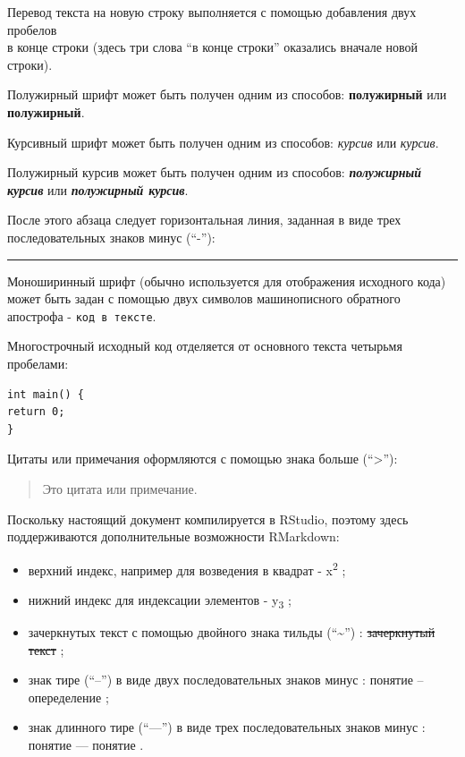 \documentclass[
  a4paper,
]{book}
\providecommand{\tightlist}{%
  \setlength{\itemsep}{0pt}\setlength{\parskip}{0pt}}
\theoremstyle{definition}
\theoremstyle{definition}
\theoremstyle{definition}
\theoremstyle{definition}
\theoremstyle{remark}
\begin{document}
Перевод текста на новую строку выполняется с помощью добавления двух пробелов\\
в конце строки (здесь три слова ``в конце строки'' оказались вначале новой строки).

Полужирный шрифт может быть получен одним из способов: \textbf{полужирный} или \textbf{полужирный}.

Курсивный шрифт может быть получен одним из способов: \emph{курсив} или \emph{курсив}.

Полужирный курсив может быть получен одним из способов: \textbf{\emph{полужирный курсив}} или \textbf{\emph{полужирный курсив}}.

После этого абзаца следует горизонтальная линия, заданная в виде трех последовательных знаков минус (``-''):

\begin{center}\rule{0.5\linewidth}{0.5pt}\end{center}

Моноширинный шрифт (обычно используется для отображения исходного кода) может быть задан с помощью двух символов машинописного обратного апострофа - \texttt{код\ в\ тексте}.

Многострочный исходный код отделяется от основного текста четырьмя пробелами:

\begin{verbatim}
int main() {
return 0;
}
\end{verbatim}

Цитаты или примечания оформляются с помощью знака больше (``\textgreater{}''):

\begin{quote}
Это цитата или примечание.
\end{quote}

Поскольку настоящий документ компилируется в RStudio, поэтому здесь поддерживаются дополнительные возможности RMarkdown:

\begin{itemize}
\tightlist
\item
  верхний индекс, например для возведения в квадрат - x\textsuperscript{2} ;
\item
  нижний индекс для индексации элементов - y\textsubscript{3} ;
\item
  зачеркнутых текст с помощью двойного знака тильды (``\textasciitilde{}'') : \st{зачеркнутый текст} ;
\item
  знак тире (``--'') в виде двух последовательных знаков минус : понятие -- опеределение ;
\item
  знак длинного тире (``---'') в виде трех последовательных знаков минус : понятие --- понятие .
\end{itemize}
\end{document}
